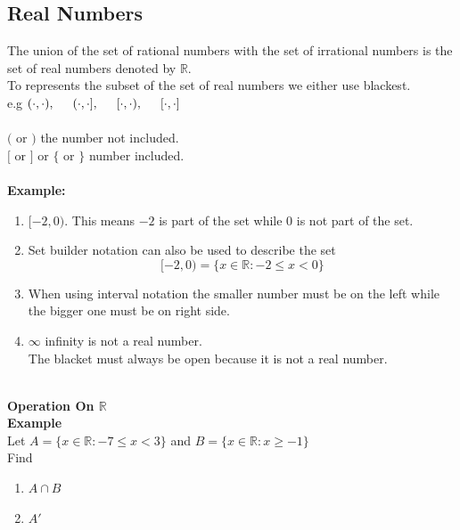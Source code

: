 \documentclass[11pt,a4paper]{article}
\begin{document}
\subsection{Real Numbers}
The union of the set of rational numbers with the set of irrational numbers is the set of real numbers denoted by $\mathbb{R}$.\\
To represents the subset of the set of real numbers we either use blackest. \\e.g\hspace{0.3cm} $(\cdot,\cdot),\hspace{0.5cm} (\cdot,\cdot],\hspace{0.5cm}[\cdot,\cdot),\hspace{0.5cm} [\cdot,\cdot]$\\\\
$($ or $)$ the number not included.\\
$[$ or $]$ or $\{$ or $\}$ number included.\\\\






\pagebreak
\textbf{Example:}
\begin{enumerate}
\item[$\bullet$] $[-2,0)$. This means $-2$ is part of the set while 0 is not part of the set.
\item[$\bullet$] Set builder notation can also be used to describe the set $$[-2,0)=\{x\in \mathbb{R}:-2\leq x<0\}$$
\item[$\bullet$] When using interval notation the smaller number must be on the left while the bigger one must be on right side.
\item[$\bullet$] $\infty$ infinity is not a real number.\\ The blacket must always be open because it is not a real number.\\\\
\end{enumerate}


\textbf{Operation On $\mathbb{R}$}\\

\textbf{Example}\\
Let $A=\{x\in \mathbb{R}:-7\leq x<3\}$ and $B=\{x\in \mathbb{R}:x\geq -1\}$\\

Find
\begin{enumerate}
\item $A\cap B$
\item $A'$\\
\end{enumerate}
\end{document}
